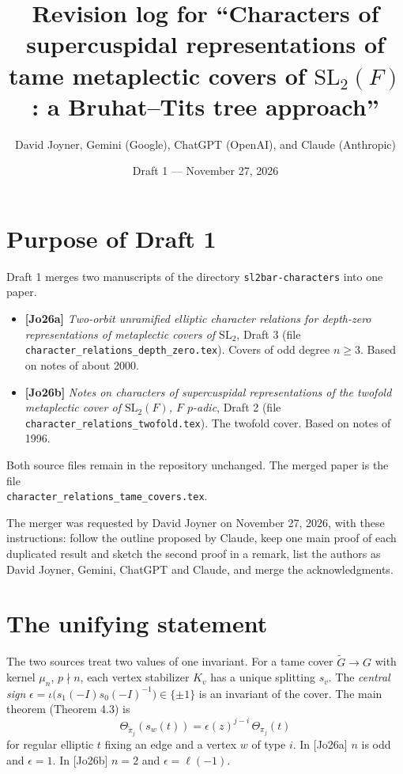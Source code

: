 \documentclass[12pt,letterpaper]{article}
\title{Revision log for ``Characters of supercuspidal representations of tame metaplectic covers of $\mathrm{SL}_2(F)$: a Bruhat--Tits tree approach''}
\author{David Joyner, Gemini (Google), ChatGPT (OpenAI), and Claude (Anthropic)}
\date{Draft 1 --- November 27, 2026}
\begin{document}
\maketitle

\section{Purpose of Draft 1}
Draft 1 merges two manuscripts of the directory \texttt{sl2bar-characters} into one paper.
\begin{itemize}[leftmargin=2em]
\item \textbf{[Jo26a]} \emph{Two-orbit unramified elliptic character relations for depth-zero representations of metaplectic covers of $\mathrm{SL}_2$}, Draft 3 (file \texttt{character\_relations\_depth\_zero.tex}). Covers of odd degree $n\ge3$. Based on notes of about 2000.
\item \textbf{[Jo26b]} \emph{Notes on characters of supercuspidal representations of the twofold metaplectic cover of $\mathrm{SL}_2(F)$, $F$ $p$-adic}, Draft 2 (file \texttt{character\_relations\_twofold.tex}). The twofold cover. Based on notes of 1996.
\end{itemize}
Both source files remain in the repository unchanged. The merged paper is the file\\ \texttt{character\_relations\_tame\_covers.tex}.

The merger was requested by David Joyner on November 27, 2026, with these instructions: follow the outline proposed by Claude, keep one main proof of each duplicated result and sketch the second proof in a remark, list the authors as David Joyner, Gemini, ChatGPT and Claude, and merge the acknowledgments.

\section{The unifying statement}
The two sources treat two values of one invariant. For a tame cover $\widetilde G\to G$ with kernel $\mu_n$, $p\nmid n$, each vertex stabilizer $K_v$ has a unique splitting $s_v$. The \emph{central sign} $\epsilon=\iota\bigl(s_1(-I)s_0(-I)^{-1}\bigr)\in\{\pm1\}$ is an invariant of the cover. The main theorem (Theorem 4.3) is
\[
 \Theta_{\widetilde\pi_j}(s_w(t))=\epsilon(z)^{j-i}\,\Theta_{\pi_j}(t)
\]
for regular elliptic $t$ fixing an edge and a vertex $w$ of type $i$. In [Jo26a] $n$ is odd and $\epsilon=1$. In [Jo26b] $n=2$ and $\epsilon=\ell(-1)$.
\end{document}
